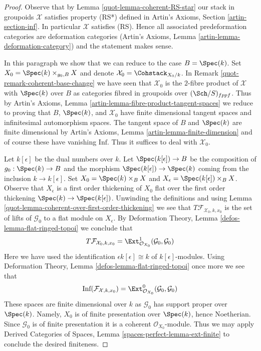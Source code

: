 \begin{proof}

Observe that by Lemma \ref{quot-lemma-coherent-RS-star}
our stack in groupoids $\mathcal{X}$ satisfies property (RS*)
defined in Artin's Axioms, Section \ref{artin-section-inf}.
In particular $\mathcal{X}$ satisfies (RS).
Hence all associated predeformation
categories are deformation categories
(Artin's Axioms, Lemma \ref{artin-lemma-deformation-category})
and the statement makes sense.

\medskip\noindent
In this paragraph we show that we can reduce to the case $B = \Spec(k)$.
Set $X_0 = \Spec(k) \times_{g_0, B} X$
and denote $\mathcal{X}_0 = \Cohstack_{X_0/k}$. In
Remark \ref{quot-remark-coherent-base-change} we have seen that
$\mathcal{X}_0$ is the $2$-fibre product of $\mathcal{X}$ with
$\Spec(k)$ over $B$ as categories fibred in groupoids over
$(\Sch/S)_{fppf}$. Thus by
Artin's Axioms, Lemma \ref{artin-lemma-fibre-product-tangent-spaces}
we reduce to proving that $B$, $\Spec(k)$, and $\mathcal{X}_0$
have finite dimensional tangent spaces and infinitesimal automorphism
spaces. The tangent space of $B$ and $\Spec(k)$ are finite dimensional by
Artin's Axioms, Lemma \ref{artin-lemma-finite-dimension}
and of course these have vanishing $\text{Inf}$.
Thus it suffices to deal with $\mathcal{X}_0$.

\medskip\noindent
Let $k[\epsilon]$ be the dual numbers over $k$.
Let $\Spec(k[\epsilon]) \to B$ be the composition of $g_0 : \Spec(k) \to B$
and the morphism $\Spec(k[\epsilon]) \to \Spec(k)$
coming from the inclusion $k \to k[\epsilon]$.
Set $X_0 = \Spec(k) \times_B X$ and
$X_\epsilon = \Spec(k[\epsilon]) \times_B X$.
Observe that $X_\epsilon$ is a first order thickening of $X_0$
flat over the first order thickening $\Spec(k) \to \Spec(k[\epsilon])$.
Unwinding the definitions and using
Lemma \ref{quot-lemma-coherent-over-first-order-thickening}
we see that $T\mathcal{F}_{\mathcal{X}_0, k, x_0}$ is the set of
lifts of $\mathcal{G}_0$ to a flat module on $X_\epsilon$.
By Deformation Theory, Lemma \ref{defos-lemma-flat-ringed-topoi}
we conclude that
$$
T\mathcal{F}_{\mathcal{X}_0, k, x_0} =
\Ext^1_{\mathcal{O}_{X_0}}(\mathcal{G}_0, \mathcal{G}_0)
$$
Here we have used the identification $\epsilon k[\epsilon] \cong k$
of $k[\epsilon]$-modules. Using
Deformation Theory, Lemma \ref{defos-lemma-flat-ringed-topoi}
once more we see that
$$
\text{Inf}(\mathcal{F}_{\mathcal{X}, k, x_0}) =
\Ext^0_{\mathcal{O}_{X_0}}(\mathcal{G}_0, \mathcal{G}_0)
$$
These spaces are finite dimensional over $k$ as $\mathcal{G}_0$
has support proper over $\Spec(k)$. Namely, $X_0$ is of finite presentation
over $\Spec(k)$, hence Noetherian. Since $\mathcal{G}_0$ is of finite
presentation it is a coherent $\mathcal{O}_{X_0}$-module. Thus we may apply
Derived Categories of Spaces, Lemma
\ref{spaces-perfect-lemma-ext-finite}
to conclude the desired finiteness.
\end{proof}

